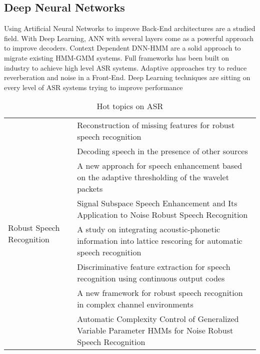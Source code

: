 \subsection{Deep Neural Networks}
Using Artificial Neural Networks to improve Back-End architectures are a studied field\cite{Trentin2001ARecognition}. With Deep Learning, ANN with several layers come as a powerful approach to improve decoders. Context Dependent DNN-HMM are a solid approach to migrate existing HMM-GMM systems\cite{Deng2012}. Full frameworks has been built on industry to achieve high level ASR systems\cite{Zou2014Mariana:Applications}. Adaptive approaches try to reduce reverberation and noise in a Front-End\cite{Narayanan2014ImprovingTraining}. Deep Learning techniques are sitting on every level of ASR systems trying to improve performance
\begin{landscape}
\begin{table}
\centering
\caption{Hot topics on ASR}
\label{tab1}
\begin{tabular}{|l|l|}
\hline
\multirow{8}{*}{Robust Speech Recognition}  
& \multicolumn{1}{l}{Reconstruction of missing features for robust speech recognition \cite{Raj2004ReconstructionRecognition}} \\ \cline{2-2} 
& \multicolumn{1}{l}{Decoding speech in the presence of other sources\cite{Barker2005DecodingSources}}  \\ \cline{2-2} 
& \multicolumn{1}{l}{A new approach for speech enhancement based on the adaptive thresholding of the wavelet packets\cite{Ghanbari2006APackets}} \\ \cline{2-2}
& \multicolumn{1}{l}{Signal Subspace Speech Enhancement and Its Application to Noise Robust Speech Recognition\cite{Hermus2006ARecognition}} \\\cline{2-2}
& \multicolumn{1}{l}{A study on integrating acoustic-phonetic information into lattice rescoring for automatic speech recognition \cite{Siniscalchi2009ARecognition}} \\\cline{2-2}
& \multicolumn{1}{l}{Discriminative feature extraction for speech recognition using continuous output codes \cite{Dehzangi2012DiscriminativeCodes}} \\\cline{2-2}
& \multicolumn{1}{l}{A new framework for robust speech recognition in complex channel environments \cite{He2014AEnvironments}} \\\cline{2-2}
& \multicolumn{1}{l}{Automatic Complexity Control of Generalized Variable Parameter HMMs for Noise Robust Speech Recognition \cite{Su2014AutomaticRecognition}} \\\hline



\end{tabular}
\end{table}
\end{landscape}
